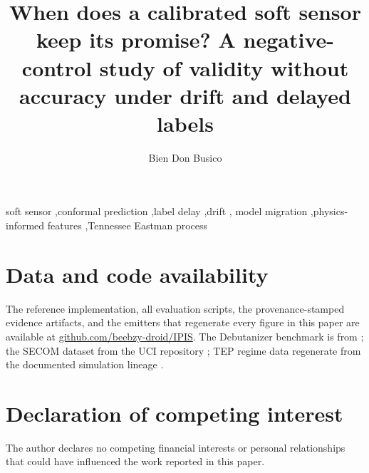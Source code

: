 \documentclass[final,5p,times,twocolumn]{elsarticle}
\begin{document}
\begin{frontmatter}

\title{When does a calibrated soft sensor keep its promise? A negative-control
study of validity without accuracy under drift and delayed labels}

\author{Bien Don Busico}
\address{Map\'ua Malayan Colleges Mindanao, Davao City, Philippines}

\begin{abstract}

\end{abstract}

\begin{keyword}
soft sensor \sep conformal prediction \sep label delay \sep drift \sep
model migration \sep physics-informed features \sep Tennessee Eastman process
\end{keyword}

\end{frontmatter}










\section*{Data and code availability}
The reference implementation, all evaluation scripts, the provenance-stamped evidence
artifacts, and the emitters that regenerate every figure in this paper are available at
\url{github.com/beebzy-droid/IPIS}. The Debutanizer benchmark is from
\citet{fortuna2007}; the SECOM dataset from the UCI repository \citep{mccann2008secom};
TEP regime data regenerate from the documented simulation lineage \citep{bathelt2015}.

\section*{Declaration of competing interest}
The author declares no competing financial interests or personal relationships that
could have influenced the work reported in this paper.



\end{document}

